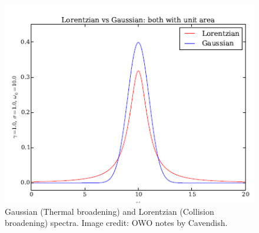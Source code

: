 \documentclass[a4paper]{article}
\begin{document}
\begin{figure}[H]
    \centering
    \includegraphics[scale=0.65]{gaussianlorentzian.PNG}
    \caption{Gaussian (Thermal broadening) and Lorentzian (Collision broadening) spectra. Image credit: OWO notes by Cavendish.}
\end{figure}

\newpage
\end{document}

